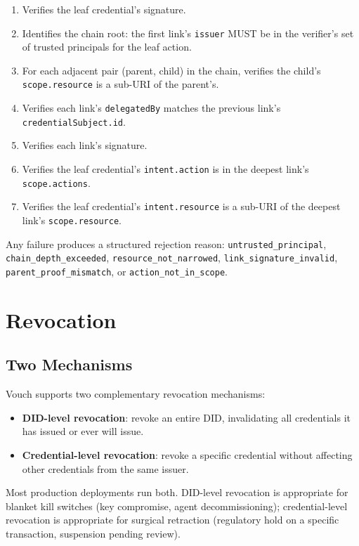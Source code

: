 \documentclass[11pt,a4paper,twocolumn]{article}
\begin{document}
\begin{enumerate}[label=\arabic*.,leftmargin=*]
\item Verifies the leaf credential's signature.
\item Identifies the chain root: the first link's \verb|issuer| MUST be in the verifier's set of trusted principals for the leaf action.
\item For each adjacent pair (parent, child) in the chain, verifies the child's \verb|scope.resource| is a sub-URI of the parent's.
\item Verifies each link's \verb|delegatedBy| matches the previous link's \verb|credentialSubject.id|.
\item Verifies each link's signature.
\item Verifies the leaf credential's \verb|intent.action| is in the deepest link's \verb|scope.actions|.
\item Verifies the leaf credential's \verb|intent.resource| is a sub-URI of the deepest link's \verb|scope.resource|.
\end{enumerate}

Any failure produces a structured rejection reason: \verb|untrusted_principal|, \verb|chain_depth_exceeded|, \verb|resource_not_narrowed|, \verb|link_signature_invalid|, \verb|parent_proof_mismatch|, or \verb|action_not_in_scope|.

\section{Revocation}
\label{sec:revocation}

\subsection{Two Mechanisms}

Vouch supports two complementary revocation mechanisms:

\begin{itemize}[leftmargin=*]
\item \textbf{DID-level revocation}: revoke an entire DID, invalidating all credentials it has issued or ever will issue.
\item \textbf{Credential-level revocation}: revoke a specific credential without affecting other credentials from the same issuer.
\end{itemize}

Most production deployments run both. DID-level revocation is appropriate for blanket kill switches (key compromise, agent decommissioning); credential-level revocation is appropriate for surgical retraction (regulatory hold on a specific transaction, suspension pending review).
\end{document}
